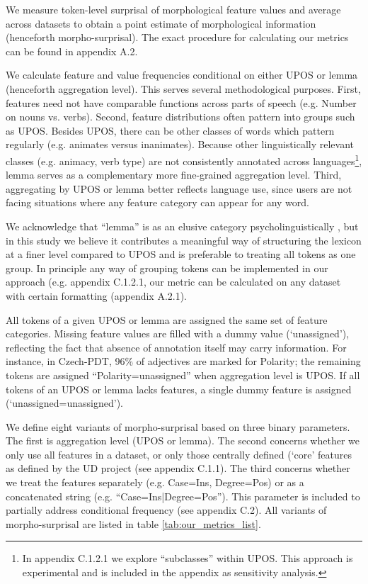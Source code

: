 \documentclass[USenglish]{article}
\begin{document}
We measure token-level surprisal of morphological feature values and average across datasets to obtain a point estimate of morphological information (henceforth morpho-surprisal).
The exact procedure for calculating our metrics can be found in appendix A.2.

We calculate feature and value frequencies conditional on either UPOS or lemma (henceforth aggregation level).
This serves several methodological purposes.
First, features need not have comparable functions across parts of speech (e.g. Number on nouns vs. verbs).
Second, feature distributions often pattern into groups such as UPOS.
Besides UPOS, there can be other classes of words which pattern regularly (e.g. animates versus inanimates).
Because other linguistically relevant classes (e.g. animacy, verb type) are not consistently annotated across languages\footnote{In appendix C.1.2.1
we explore ``subclasses'' within UPOS. This approach is experimental and is included in the appendix as sensitivity analysis.}, lemma serves as a complementary more fine-grained aggregation level.
Third, aggregating by UPOS or lemma better reflects language use, since users are not facing situations where any feature category can appear for any word.

We acknowledge that ``lemma'' is as an elusive category psycholinguistically  \citep{meyer_elusive_2026}, but in this study we believe it contributes a meaningful way of structuring the lexicon at a finer level compared to UPOS and is preferable to treating all tokens as one group.
In principle any way of grouping tokens can be implemented in our approach (e.g. appendix C.1.2.1,
our metric can be calculated on any dataset with certain formatting (appendix A.2.1).

All tokens of a given UPOS or lemma are assigned the same set of feature categories.
Missing feature values are filled with a dummy value (`unassigned'), reflecting the fact that absence of annotation itself may carry information.
For instance, in Czech-PDT, 96\% of adjectives are marked for Polarity; the remaining tokens are assigned ``Polarity=unassigned'' when aggregation level is UPOS.
If all tokens of an UPOS or lemma lacks features, a single dummy feature is assigned (`unassigned=unassigned').

We define eight variants of morpho-surprisal based on three binary parameters. 
The first is aggregation level (UPOS or lemma).
The second concerns whether we only use all features in a dataset, or only those centrally defined (`core' features as defined by the UD project (see appendix C.1.1).
The third concerns whether we treat the features separately (e.g. Case=Ins, Degree=Pos) or as a concatenated string (e.g. ``Case=Ins|Degree=Pos''). 
This parameter is included to partially address conditional frequency (see appendix C.2).
All variants of morpho-surprisal are listed in table \ref{tab:our_metrics_list}.
\end{document}
